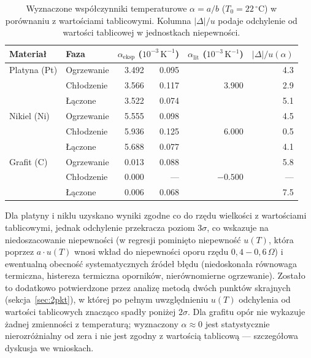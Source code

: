 \documentclass[12pt, a4paper]{article}
\begin{document}
\begin{table}[H]
\centering
\caption{Wyznaczone współczynniki temperaturowe $\alpha = a/b$ ($T_0 = 22\,^\circ\mathrm{C}$)
         w porównaniu z wartościami tablicowymi.
         Kolumna $|\Delta|/u$ podaje odchylenie od wartości tablicowej w jednostkach
         niepewności.}\label{tab:alpha}
\begin{tabular}{l l r @{$\;\pm\;$} r r r}
\toprule
Materiał & Faza &
\multicolumn{2}{c}{$\alpha_{\mathrm{eksp}}$ ($10^{-3}\,\mathrm{K}^{-1}$)} &
{$\alpha_{\mathrm{lit}}$ ($10^{-3}\,\mathrm{K}^{-1}$)} &
{$|\Delta|/u(\alpha)$} \\
\midrule
Platyna (Pt) & Ogrzewanie & \num{3.492} & \num{0.095} & \multirow{3}{*}{\num{3.900}} & \num{4.3} \\
             & Chłodzenie & \num{3.566} & \num{0.117} &                              & \num{2.9} \\
             & Łączone    & \num{3.522} & \num{0.074} &                              & \num{5.1} \\
\addlinespace
Nikiel (Ni)  & Ogrzewanie & \num{5.555} & \num{0.098} & \multirow{3}{*}{\num{6.000}} & \num{4.5} \\
             & Chłodzenie & \num{5.936} & \num{0.125} &                              & \num{0.5} \\
             & Łączone    & \num{5.688} & \num{0.077} &                              & \num{4.1} \\
\addlinespace
Grafit (C)   & Ogrzewanie & \num{0.013} & \num{0.088} & \multirow{3}{*}{$-\num{0.500}$} & \num{5.8} \\
             & Chłodzenie & \num{0.000} & ---         &                                 & --- \\
             & Łączone    & \num{0.006} & \num{0.068} &                                 & \num{7.5} \\
\bottomrule
\end{tabular}
\end{table}

Dla platyny i niklu uzyskano wyniki zgodne co do rzędu wielkości z wartościami tablicowymi,
jednak odchylenie przekracza poziom $3\sigma$, co wskazuje na niedoszacowanie niepewności (w regresji pominięto niepewność $u(T)$, która poprzez $a \cdot u(T)$ wnosi wkład do niepewności oporu rzędu $0,4-0,6\,\Omega$) i ewentualną obecność systematycznych źródeł
błędu (niedoskonała równowaga termiczna, histereza termiczna oporników, nierównomierne
ogrzewanie). Zostało to dodatkowo potwierdzone przez analizę metodą dwóch punktów skrajnych (sekcja~\ref{sec:2pkt}), w której po pełnym uwzględnieniu $u(T)$ odchylenia od wartości tablicowych znacząco spadły poniżej $2\sigma$. Dla grafitu opór nie wykazuje żadnej zmienności z temperaturą; 
wyznaczony $\alpha \approx 0$ jest statystycznie nierozróżnialny od zera i nie jest zgodny z wartością tablicową --- szczegółowa dyskusja we wnioskach.
\end{document}
